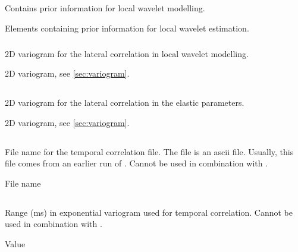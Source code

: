 \subsection{}
 \slist
   \item \Description Contains prior information for local wavelet modelling.
   \item \Argument Elements containing prior information for local wavelet estimation.
   \item \Default
 \elist

\subsubsection{}
 \slist
   \item \Description 2D variogram for the lateral correlation in local wavelet  modelling.
   \item \Argument 2D variogram, see \autoref{sec:variogram}.
   \item \Default
 \elist

\subsection{}
 \slist
   \item \Description 2D variogram for the lateral correlation in the elastic parameters.
   \item \Argument 2D variogram, see \autoref{sec:variogram}.
   \item \Default
 \elist

\subsection{}
 \slist
   \item \Description File name for the temporal correlation file. The file is an ascii file. Usually, this file comes from an earlier run of \crava. Cannot be used in combination with .
   \item \Argument File name
   \item \Default
 \elist
 
 \subsection{}
  \slist
    \item \Description Range (ms) in exponential variogram used for temporal correlation. Cannot be used in combination with .
    \item \Argument Value
    \item \Default
 \elist

